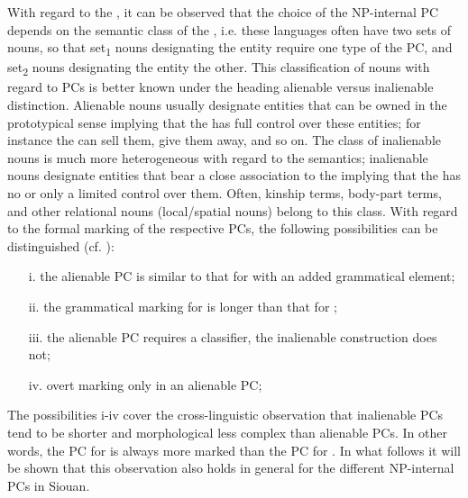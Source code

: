 \documentclass[output=paper]{LSP/langsci}
\begin{document}
With regard to the , it can be observed that the choice of the NP-internal PC depends on the semantic class of the , i.e. these languages often have two sets of nouns, so that set\textsubscript{1} nouns designating the  entity require one type of the PC, and set\textsubscript{2} nouns designating the  entity the other. This classification of nouns with regard to PCs is better known under the heading alienable versus inalienable distinction. Alienable nouns usually designate entities that can be owned in the prototypical sense implying that the  has full control over these  entities; for instance the  can sell them, give them away, and so on. The class of inalienable nouns is much more heterogeneous with regard to the semantics; inalienable nouns designate entities that bear a close association to the  implying that the  has no or only a limited control over them. Often, kinship terms, body-part terms, and other relational nouns (local/spatial nouns) belong to this class. 
With regard to the formal marking of the respective PCs, the following possibilities can be distinguished (cf. \citealt[286--290]{Dixon2010}):

\begin{enumerate}


\item[i.]	the alienable PC is similar to that for  with an added grammatical element;

\item[ii.]	the grammatical marking for  is longer than that for ;

\item[iii.]	the alienable PC requires a classifier, the inalienable construction does not;

\item[iv.]	overt marking only in an alienable PC;
\end{enumerate}


The possibilities i-iv cover the cross-linguistic observation that inalienable PCs tend to be shorter and morphological less complex than alienable PCs. In other words, the PC for  is always more marked than the PC for . In what follows it will be shown that this observation also holds in general for the different NP-internal PCs in Siouan.
\end{document}
